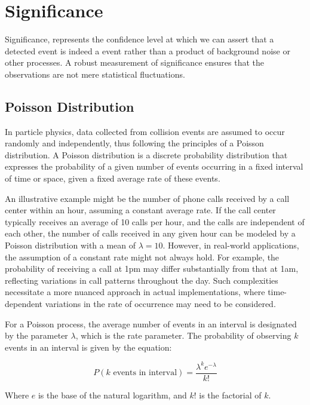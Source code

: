 \section{Significance}

Significance, represents the confidence level at which we can assert that a detected event is
indeed a \tth event rather than a product of background noise or other processes. A robust measurement of significance
ensures that the observations are not mere statistical fluctuations.

\subsection{Poisson Distribution}

In particle physics, data collected from collision events are assumed to occur randomly and independently, thus
following the principles of a Poisson distribution. A Poisson distribution is a discrete probability distribution that
expresses the probability of a given number of events occurring in a fixed interval of time or space, given a fixed
average rate of these events.

An illustrative example might be the number of phone calls received by a call center within an hour, assuming a constant
average rate. If the call center typically receives an average of 10 calls per hour, and the calls are independent of
each other, the number of calls received in any given hour can be modeled by a Poisson distribution with a mean of
$\lambda = 10$. However, in real-world applications, the assumption of a constant rate might not always hold. For
example, the probability of receiving a call at 1pm may differ substantially from that at 1am, reflecting variations in
call patterns throughout the day. Such complexities necessitate a more nuanced approach in actual implementations, where
time-dependent variations in the rate of occurrence may need to be considered.

For a Poisson process, the average number of events in an interval is designated by the parameter
$\lambda$, which is
the rate parameter. The probability of observing $k$ events in an interval is given by the equation:

\begin{equation}
    P(k \text{ events in interval}) = \frac{\lambda^k e^{-\lambda}}{k!}
\end{equation}

Where $e$ is the base of the natural logarithm, and $k!$ is the factorial of $k$.

